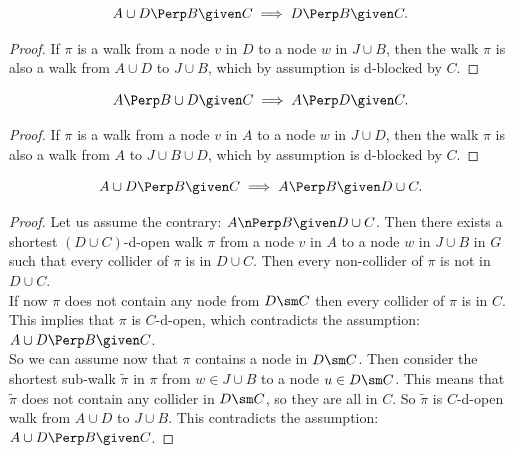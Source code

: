 \begin{Lem}
    \[ A \cup D \Perp  B \given C \implies D \Perp  B \given C.\]
\begin{proof}
If $\pi$ is a walk from a node $v$ in $D$ to a node $w$ in $J \cup B$, then 
the walk $\pi$ is also a walk from $A \cup D$ to $J \cup B$, which by assumption is d-blocked by $C$.
\end{proof}
\end{Lem}

\begin{Lem}
    \[ A \Perp  B \cup D\given C  \implies A \Perp  D \given C.\]
\begin{proof}
If $\pi$ is a walk from a node $v$ in $A$ to a node $w$ in $J \cup D$, then %
the walk  $\pi$ is also a walk from $A$ to $J \cup B \cup D$, which by assumption is d-blocked by $C$. 
\end{proof}
\end{Lem}

\begin{Lem}
    \label{d-sep-left-weak-union}
    \[A \cup D \Perp  B  \given C \implies A \Perp  B \given D\cup C.\]
\begin{proof}
    Let us assume the contrary:  $A \nPerp  B \given D\cup C$. Then there exists a shortest $(D \cup C)$-d-open walk $\pi$ 
    from a node $v$ in $A$ to a node $w$ in $J \cup B$ in $G$ such that every collider of $\pi$ is in $D \cup C$.
    Then every non-collider of $\pi$ is not in $D \cup C$.\\
    If now $\pi$ does not contain any node from $D \sm C$ then every collider of $\pi$ is in $C$. 
    This implies that $\pi$ is $C$-d-open, 
    which contradicts the assumption: $A \cup D \Perp  B  \given C$.\\
    So we can assume now that $\pi$ contains a node in $D \sm C$. 
    Then consider the shortest sub-walk $\tilde \pi$ in 
    $\pi$ from $w \in J \cup B$ to a node $u \in D \sm C$. This means that $\tilde \pi$ does not contain any collider in $D\sm C$, 
    so they are all in $C$. So $\tilde \pi$ is $C$-d-open walk from $A \cup D$ to $J \cup B$. 
    This contradicts the assumption: $A \cup D \Perp  B  \given C$.
\end{proof}
\end{Lem}

